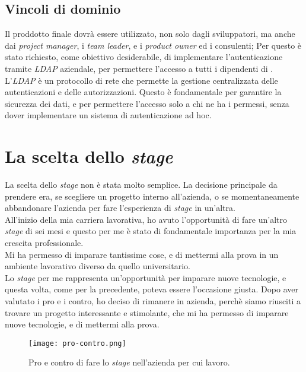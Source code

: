 \subsection*{ Vincoli di dominio}
Il proddotto finale dovrà essere utilizzato, non solo dagli sviluppatori, ma anche dai \textit{project manager}, i \textit{team leader}, e i \textit{product owner} ed
i consulenti; Per questo è stato richiesto, come obiettivo desiderabile, di implementare l'autenticazione tramite \textit{LDAP} aziendale, 
per permettere l'accesso a tutti i dipendenti di {\azienda}.\\
L'\textit{LDAP} è un protocollo di rete che permette la gestione centralizzata delle autenticazioni e delle autorizzazioni.
Questo è fondamentale per garantire la sicurezza dei dati, e per permettere l'accesso solo a chi ne ha i permessi, senza dover
implementare un sistema di autenticazione ad hoc.\\



\section{La scelta dello \textit{stage}}
La scelta dello \textit{stage} non è stata molto semplice. La decisione principale da prendere era, se scegliere un progetto interno all'azienda, o 
se momentaneamente abbandonare l'azienda per fare l'esperienza di \textit{stage} in un'altra.\\ 
All'inizio della mia carriera lavorativa, ho avuto l'opportunità di fare un'altro \textit{stage} di sei mesi e questo per me è stato di fondamentale
importanza per la mia crescita professionale.\\ Mi ha permesso di imparare tantissime cose, e di mettermi alla prova in un ambiente lavorativo
diverso da quello universitario.\\ 
Lo \textit{stage} per me rappresenta un'opportunità per imparare nuove tecnologie, e questa volta, come per la precedente, poteva essere l'occasione giusta. 
Dopo aver valutato i pro e i contro, ho deciso di rimanere in azienda, perchè siamo riusciti
a trovare un progetto interessante e stimolante, che mi ha permesso di imparare nuove tecnologie, e di mettermi alla prova.\\
\begin{figure}[!h] 
  \centering 
  \texttt{[image: pro-contro.png]}
  \caption{Pro e contro di fare lo \textit{stage} nell'azienda per cui lavoro.}
  \label{fig:pro-contro}
\end{figure}

